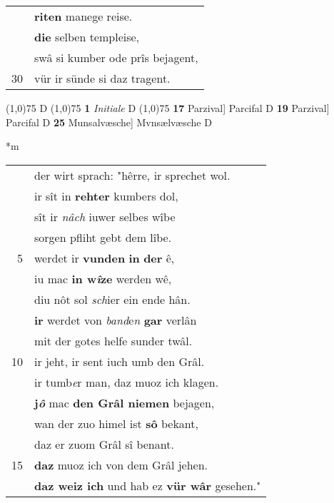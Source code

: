 \documentclass[8pt,a4paper,notitlepage]{article}
\begin{document}
\begin{table}[ht]
\begin{minipage}[t]{0.5\linewidth}
\begin{tabular}{rl}
 & \textbf{riten} manege reise.\\ 
 & \textbf{die} selben templeise,\\ 
 & swâ si kumber ode prîs bejagent,\\ 
30 & vür ir sünde si daz tragent.\\ 
\end{tabular}
\scriptsize
\line(1,0){75} \newline
D \newline
\line(1,0){75} \newline
\textbf{1} \textit{Initiale} D  \newline
\line(1,0){75} \newline
\textbf{17} Parzival] Parcifal D \textbf{19} Parzival] Parcifal D \textbf{25} Munsalvæsche] Mvnsælvæsche D \newline
\end{minipage}
\hspace{0.5cm}
\begin{minipage}[t]{0.5\linewidth}
\small
\begin{center}*m
\end{center}
\begin{tabular}{rl}
 & der wirt sprach: "hêrre, ir sprechet wol.\\ 
 & ir sît in \textbf{rehter} kumbers dol,\\ 
 & sît ir \textit{nâch} iuwer selbes wîbe\\ 
 & sorgen pfliht gebt dem lîbe.\\ 
5 & werdet ir \textbf{vunden} \textbf{in} \textbf{der} ê,\\ 
 & iu mac \textbf{in w\textit{î}ze} werden wê,\\ 
 & diu nôt sol \textit{sch}ier ein ende hân.\\ 
 & \textbf{ir} werdet von \textit{band}e\textit{n} \textbf{gar} verlân\\ 
 & mit der gotes helfe sunder twâl.\\ 
10 & ir jeht, ir sent iuch umb den Grâl.\\ 
 & ir tumb\textit{e}r man, daz muoz ich klagen.\\ 
 & \textbf{j\textit{ô}} mac \textbf{den Grâl niemen} bejagen,\\ 
 & wan der zuo himel ist \textbf{sô} bekant,\\ 
 & daz er zuom Grâl sî benant.\\ 
15 & \textbf{daz} muoz ich von dem Grâl jehen.\\ 
 & \textbf{daz weiz ich} und hab ez \textbf{vür wâr} gesehen."\\ 

\end{tabular}
\end{minipage}
\end{table}
\end{document}
